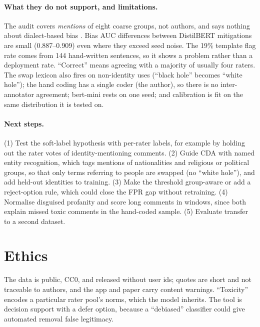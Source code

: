 \paragraph{What they do not support, and limitations.} The audit covers \emph{mentions} of eight coarse groups, not
authors, and says nothing about dialect-based bias \citep{sap2019risk}. Bias AUC differences between DistilBERT
mitigations are small (0.887--0.909) even where they exceed seed noise. The 19\% template flag rate comes from 144
hand-written sentences, so it shows a problem rather than a deployment rate. ``Correct'' means agreeing with a
majority of usually four raters. The swap lexicon also fires on non-identity uses (``black hole'' becomes ``white hole''); the hand coding
has a single coder (the author), so there is no inter-annotator agreement; bert-mini rests on one seed; and
calibration is fit on the same distribution it is tested on.

\paragraph{Next steps.} (1) Test the soft-label hypothesis with per-rater labels, for example by holding out the rater
votes of identity-mentioning comments. (2) Guide CDA with named entity recognition, which tags mentions of nationalities
and religious or political groups, so that only terms referring to people are swapped (no ``white hole''), and add
held-out identities to training. (3) Make the threshold group-aware or add a reject-option rule, which could close the FPR gap without
retraining. (4) Normalise disguised profanity and score long comments in windows, since both explain missed toxic
comments in the hand-coded sample. (5) Evaluate transfer to a second dataset.

\section{Ethics}
The data is public, CC0, and released without user ids; quotes are short and not traceable to authors, and the app
and paper carry content warnings. ``Toxicity'' encodes a particular rater pool's norms, which the model inherits. The
tool is decision support with a defer option, because a ``debiased'' classifier could give automated removal false
legitimacy.

